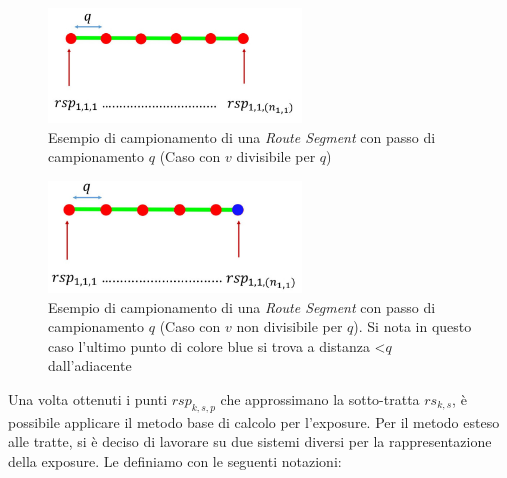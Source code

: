 \begin{figure}[h]
	\centering
\includegraphics[width=0.6\textwidth]{images/routes3}
\caption{Esempio di campionamento di una \textit{Route Segment} con passo di campionamento $q$ (Caso con $v$ divisibile per $q$) }
\label{img:campionamento}
\end{figure}

\begin{figure}[h]
	\centering
\includegraphics[width=0.6\textwidth]{images/routes4}
\caption{Esempio di campionamento di una \textit{Route Segment} con passo di campionamento $q$ (Caso con $v$ non divisibile per $q$). Si nota in questo caso l'ultimo punto di colore blue si trova a distanza <$q$ dall'adiacente }
\label{img:campionamento_2}
\end{figure}

\newpage
\noindent Una volta ottenuti i punti $rsp_{k,s,p}$ che approssimano la sotto-tratta $rs_{k,s}$, è possibile applicare il metodo base di calcolo per l'exposure. Per il metodo esteso alle tratte, si è deciso di lavorare su due sistemi diversi per la rappresentazione della exposure. Le definiamo con le seguenti notazioni:

